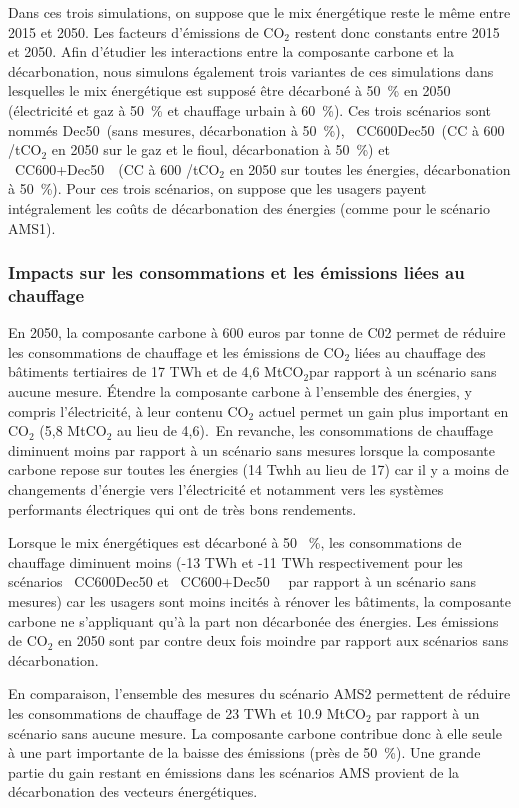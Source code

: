 \documentclass[10.5pt,a4paper]{article}
\def\euro{\mbox{\raisebox{.25ex}{{\it =}}\hspace{-.5em}{\sf C}}}
\begin{document}
{Dans ces trois simulations, on suppose que le mix énergétique reste le même entre 2015 et 2050. Les facteurs d'émissions de CO$_2$ restent donc constants entre 2015 et 2050. Afin d'étudier les interactions entre la composante carbone et la décarbonation, nous simulons également trois variantes de ces simulations dans lesquelles le mix énergétique est supposé être décarboné à 50~\% en 2050 (électricité et gaz à 50~\% et chauffage urbain à 60~\%). Ces trois scénarios sont nommés \og Dec50\fg~(sans mesures, décarbonation à 50~\%),  \og~CC600Dec50\fg~(CC à 600 \euro/tCO$_2$ en 2050 sur le gaz et le fioul, décarbonation à 50~\%) et \og~CC600+Dec50~\fg~(CC à 600 \euro/tCO$_2$ en 2050 sur toutes les énergies, décarbonation à 50~\%). Pour ces trois scénarios, on suppose que les usagers payent intégralement les coûts de décarbonation des énergies (comme pour le scénario AMS1).

\subsubsection{Impacts sur les consommations et les émissions liées au chauffage}

En 2050, la composante carbone à 600 euros par tonne de C02 permet de réduire les consommations de chauffage et les émissions de CO$_2$ liées au chauffage des bâtiments tertiaires de 17 TWh et de 4,6 MtCO$_2$par rapport à un scénario sans aucune mesure. Étendre la composante carbone à l'ensemble des énergies, y compris l’électricité, à leur contenu CO$_2$ actuel permet un gain plus important en CO$_2$  (5,8 MtCO$_2$ au lieu de 4,6). En revanche, les consommations de chauffage diminuent moins par rapport à un scénario sans mesures lorsque la composante carbone repose sur toutes les énergies (14 Twhh au lieu de 17) car il y a moins de changements d'énergie vers l'électricité et notamment vers les systèmes performants électriques qui ont de très bons rendements.

Lorsque le mix énergétiques est décarboné à 50 ~\%, les consommations de chauffage diminuent moins (-13 TWh et -11 TWh respectivement pour les scénarios \og~CC600Dec50 et \og~CC600+Dec50~\fg~ par rapport à un scénario sans mesures) car les usagers sont moins incités à rénover les bâtiments, la composante carbone ne s'appliquant qu'à la part non décarbonée des énergies. Les émissions de CO$_2$ en 2050 sont par contre deux fois moindre par rapport aux scénarios sans décarbonation. 

En comparaison, l'ensemble des mesures du scénario AMS2 permettent de réduire les consommations de chauffage de 23 TWh et 10.9 MtCO$_2$ par rapport à un scénario sans aucune mesure. La composante carbone contribue donc à elle seule à une part importante de la baisse des émissions (près de 50~\%). Une grande partie du gain restant en émissions dans les scénarios AMS provient de la décarbonation des vecteurs énergétiques. 

}
\end{document}
